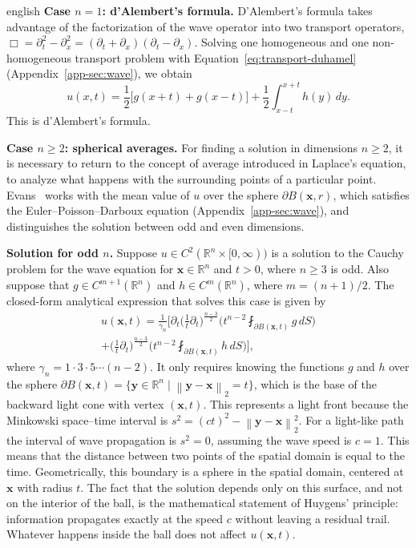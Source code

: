 \documentclass[12pt,letterpaper,twoside]{book}
\newcommand{\norm}[1]{\left\lVert #1 \right\rVert}
\begin{document}
\begin{hyphenrules}{english}
\textbf{Case $n=1$: d'Alembert's formula.}
D'Alembert's formula takes advantage of the factorization of the wave operator into two transport
operators, $\Box=\partial_t^2-\partial_x^2=(\partial_t+\partial_x)(\partial_t-\partial_x)$. Solving one
homogeneous and one non-homogeneous transport problem with Equation~\eqref{eq:transport-duhamel}
(Appendix~\ref{app-sec:wave}), we obtain
\begin{equation}
  u(x,t)=\frac12\big[g(x+t)+g(x-t)\big]+\frac12\int_{x-t}^{x+t}h(y)\,d y.
  \label{eq:dalembert}
\end{equation}
This is d'Alembert's formula.

\textbf{Case $n\ge2$: spherical averages.}
For finding a solution in dimensions $n\ge2$, it is necessary to return to the concept of average
introduced in Laplace's equation, to analyze what happens with the surrounding points of a particular
point. Evans~\cite{evans2010} works with the mean value of $u$ over the sphere $\partial B(\mathbf{x},r)$,
which satisfies the Euler--Poisson--Darboux equation (Appendix~\ref{app-sec:wave}), and distinguishes the
solution between odd and even dimensions.

\textbf{Solution for odd $n$.}
Suppose $u\in C^2(\mathbb{R}^n\times[0,\infty))$ is a solution to the Cauchy problem for the wave equation for
$\mathbf{x}\in\mathbb{R}^n$ and $t>0$, where $n\ge3$ is odd. Also suppose that $g\in C^{m+1}(\mathbb{R}^n)$ and
$h\in C^m(\mathbb{R}^n)$, where $m=(n+1)/2$. The closed-form analytical expression that solves this case is
given by \cite{evans2010}
\begin{multline}
  u(\mathbf{x},t)=\frac{1}{\gamma_n}\Bigg[\partial_t\Big(\frac1t\partial_t\Big)^{\frac{n-3}{2}}
    \Big(t^{n-2}\fint_{\partial B(\mathbf{x},t)}g\,d S\Big)\\
    +\Big(\frac1t\partial_t\Big)^{\frac{n-3}{2}}\Big(t^{n-2}\fint_{\partial B(\mathbf{x},t)}h\,d S\Big)\Bigg],
  \label{eq:wave-odd}
\end{multline}
where $\gamma_n=1\cdot3\cdot5\cdots(n-2)$. It only requires knowing the functions $g$ and $h$ over the
sphere $\partial B(\mathbf{x},t)=\{\mathbf{y}\in\mathbb{R}^n\mid\norm{\mathbf{y}-\mathbf{x}}_2=t\}$, which is the base of the backward light
cone with vertex $(\mathbf{x},t)$. This represents a light front because the Minkowski space--time interval is
$s^2=(ct)^2-\norm{\mathbf{y}-\mathbf{x}}_2^2$. For a light-like path the interval of wave propagation is $s^2=0$,
assuming the wave speed is $c=1$. This means that the distance between two points of the spatial domain
is equal to the time. Geometrically, this boundary is a sphere in the spatial domain, centered at $\mathbf{x}$
with radius $t$. The fact that the solution depends only on this surface, and not on the interior of
the ball, is the mathematical statement of Huygens' principle: information propagates exactly at the
speed $c$ without leaving a residual trail. Whatever happens inside the ball does not affect $u(\mathbf{x},t)$.


\end{hyphenrules}
\end{document}
